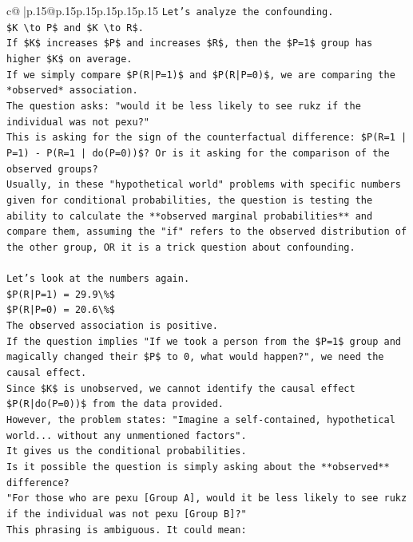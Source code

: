 \documentclass{article}
\begin{document}
{\begin{supertabular}{c@{$\;$}|p{.15\linewidth}@{}p{.15\linewidth}p{.15\linewidth}p{.15\linewidth}p{.15\linewidth}p{.15\linewidth}}
{{{\texttt{Let's analyze the confounding.} \\
\texttt{\$K \textbackslash{}to P\$ and \$K \textbackslash{}to R\$.} \\
\texttt{If \$K\$ increases \$P\$ and increases \$R\$, then the \$P=1\$ group has higher \$K\$ on average.} \\
\texttt{If we simply compare \$P(R|P=1)\$ and \$P(R|P=0)\$, we are comparing the *observed* association.} \\
\texttt{The question asks: "would it be less likely to see rukz if the individual was not pexu?"} \\
\texttt{This is asking for the sign of the counterfactual difference: \$P(R=1 | P=1) {-} P(R=1 | do(P=0))\$? Or is it asking for the comparison of the observed groups?} \\
\texttt{Usually, in these "hypothetical world" problems with specific numbers given for conditional probabilities, the question is testing the ability to calculate the **observed marginal probabilities** and compare them, assuming the "if" refers to the observed distribution of the other group, OR it is a trick question about confounding.} \\
\\ 
\texttt{Let's look at the numbers again.} \\
\texttt{\$P(R|P=1) = 29.9\textbackslash{}\%\$} \\
\texttt{\$P(R|P=0) = 20.6\textbackslash{}\%\$} \\
\texttt{The observed association is positive.} \\
\texttt{If the question implies "If we took a person from the \$P=1\$ group and magically changed their \$P\$ to 0, what would happen?", we need the causal effect.} \\
\texttt{Since \$K\$ is unobserved, we cannot identify the causal effect \$P(R|do(P=0))\$ from the data provided.} \\
\texttt{However, the problem states: "Imagine a self{-}contained, hypothetical world... without any unmentioned factors".} \\
\texttt{It gives us the conditional probabilities.} \\
\texttt{Is it possible the question is simply asking about the **observed** difference?} \\
\texttt{"For those who are pexu {[}Group A{]}, would it be less likely to see rukz if the individual was not pexu {[}Group B{]}?"} \\
\texttt{This phrasing is ambiguous. It could mean:} \\
}}}
\end{supertabular}}
\end{document}
